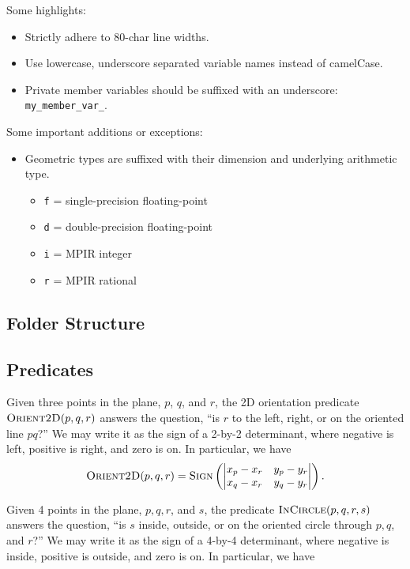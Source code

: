 Some highlights:

\begin{itemize}
  \item Strictly adhere to 80-char line widths.
  \item Use lowercase, underscore separated variable names instead of
  camelCase.
  \item Private member variables should be suffixed with an underscore:
  \texttt{my\_member\_var\_}.
\end{itemize}

Some important additions or exceptions:

\begin{itemize}
  \item Geometric types are suffixed with their dimension and underlying
  arithmetic type.
  \begin{itemize}
    \item \texttt{f} = single-precision floating-point
    \item \texttt{d} = double-precision floating-point
    \item \texttt{i} = MPIR integer
    \item \texttt{r} = MPIR rational
  \end{itemize}
\end{itemize}
  

\subsection{Folder Structure}\label{appdx:folder-structure}

\subsection{Predicates}\label{appdx:predicates}
 
Given three points in the plane, $p$, $q$, and $r$, the 2D orientation predicate
$\textsc{Orient2D}(p, q, r)$ answers the question, ``is $r$ to the left, right,
or on the oriented line $pq$?'' We may write it as the sign of a 2-by-2
determinant, where negative is left, positive is right, and zero is on. In
particular, we have 
\[
\textsc{Orient2D}(p, q, r) = \textsc{Sign}
\left(
	\begin{vmatrix} 
		x_p-x_r & y_p-y_r \\ 
		x_q-x_r & y_q-y_r 
	\end{vmatrix} 
\right).
\]
 

Given 4 points in the plane, $p, q, r$, and $s$, the predicate
$\textsc{InCircle}(p, q, r, s)$ answers the question, ``is $s$ inside, outside,
or on the oriented circle through $p, q$, and $r$?'' We may write it as the sign
of a 4-by-4 determinant, where negative is inside, positive is outside, and zero
is on. In particular, we have

